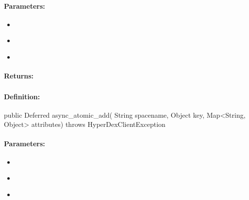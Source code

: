 \paragraph{Parameters:}
\begin{itemize}[noitemsep]
\item {}\\

\item {}\\

\item {}\\

\end{itemize}

\paragraph{Returns:}


\pagebreak
\subsubsection{}
\label{api:java:async_atomic_add}


\paragraph{Definition:}
\begin{javacode}
public Deferred async_atomic_add(
        String spacename,
        Object key,
        Map<String, Object> attributes) throws HyperDexClientException
\end{javacode}

\paragraph{Parameters:}
\begin{itemize}[noitemsep]
\item {}\\

\item {}\\

\item {}\\

\end{itemize}

